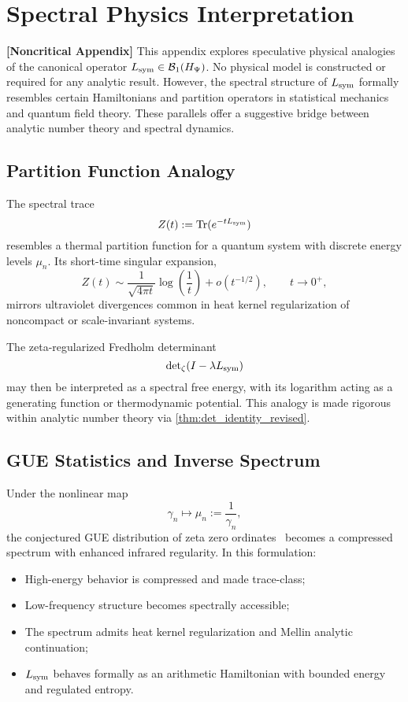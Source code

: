 \section{Spectral Physics Interpretation}
\label{app:spectral_physics_link}

\noindent\textbf{[Noncritical Appendix]}  
This appendix explores speculative physical analogies of the canonical operator \( L_{\mathrm{sym}} \in \mathcal{B}_1(H_{\Psi}) \). No physical model is constructed or required for any analytic result. However, the spectral structure of \( L_{\mathrm{sym}} \) formally resembles certain Hamiltonians and partition operators in statistical mechanics and quantum field theory. These parallels offer a suggestive bridge between analytic number theory and spectral dynamics.

\subsection*{Partition Function Analogy}

The spectral trace
\[
Z(t) := \operatorname{Tr}(e^{-t L_{\mathrm{sym}}})
\]
resembles a thermal partition function for a quantum system with discrete energy levels \( \mu_n \). Its short-time singular expansion,
\[
Z(t) \sim \frac{1}{\sqrt{4\pi t}} \log\left( \frac{1}{t} \right) + o(t^{-1/2}), \qquad t \to 0^+,
\]
mirrors ultraviolet divergences common in heat kernel regularization of noncompact or scale-invariant systems.

The zeta-regularized Fredholm determinant
\[
\det\nolimits_{\zeta}(I - \lambda L_{\mathrm{sym}})
\]
may then be interpreted as a spectral free energy, with its logarithm acting as a generating function or thermodynamic potential. This analogy is made rigorous within analytic number theory via \cref{thm:det_identity_revised}.

\subsection*{GUE Statistics and Inverse Spectrum}

Under the nonlinear map
\[
\gamma_n \longmapsto \mu_n := \frac{1}{\gamma_n},
\]
the conjectured GUE distribution of zeta zero ordinates~\cite{Montgomery1973PairCorrelation, Berry1986RiemannSpectra} becomes a compressed spectrum with enhanced infrared regularity. In this formulation:

\begin{itemize}
  \item High-energy behavior is compressed and made trace-class;
  \item Low-frequency structure becomes spectrally accessible;
  \item The spectrum admits heat kernel regularization and Mellin analytic continuation;
  \item \( L_{\mathrm{sym}} \) behaves formally as an arithmetic Hamiltonian with bounded energy and regulated entropy.
\end{itemize}

